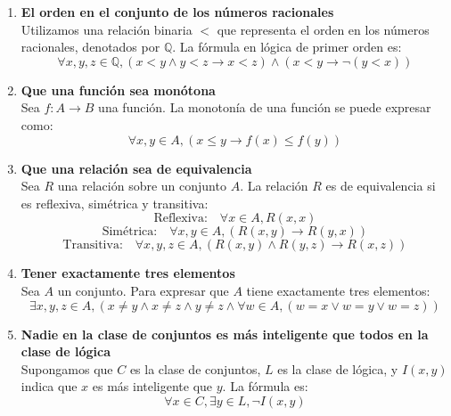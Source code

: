 \begin{solution}
    \begin{enumerate}
    \item \textbf{El orden en el conjunto de los números racionales} \\
    Utilizamos una relación binaria \( < \) que representa el orden en los números racionales, denotados por \( \mathbb{Q} \). La fórmula en lógica de primer orden es:
    \[
    \forall x, y, z \in \mathbb{Q}, (x < y \land y < z \rightarrow x < z) \land (x < y \rightarrow \neg(y < x))
    \]

    \item \textbf{Que una función sea monótona} \\
    Sea \( f: A \rightarrow B \) una función. La monotonía de una función se puede expresar como:
    \[
    \forall x, y \in A, (x \leq y \rightarrow f(x) \leq f(y))
    \]

    \item \textbf{Que una relación sea de equivalencia} \\
    Sea \( R \) una relación sobre un conjunto \( A \). La relación \( R \) es de equivalencia si es reflexiva, simétrica y transitiva:
    \[
    \text{Reflexiva:} \quad \forall x \in A, R(x, x)
    \]
    \[
    \text{Simétrica:} \quad \forall x, y \in A, (R(x, y) \rightarrow R(y, x))
    \]
    \[
    \text{Transitiva:} \quad \forall x, y, z \in A, (R(x, y) \land R(y, z) \rightarrow R(x, z))
    \]

    \item \textbf{Tener exactamente tres elementos} \\
    Sea \( A \) un conjunto. Para expresar que \( A \) tiene exactamente tres elementos:
    \[
    \exists x, y, z \in A, (x \neq y \land x \neq z \land y \neq z \land \forall w \in A, (w = x \lor w = y \lor w = z))
    \]

    \item \textbf{Nadie en la clase de conjuntos es más inteligente que todos en la clase de lógica} \\
    Supongamos que \( C \) es la clase de conjuntos, \( L \) es la clase de lógica, y \( I(x, y) \) indica que \( x \) es más inteligente que \( y \). La fórmula es:
    \[
    \forall x \in C, \exists y \in L, \neg I(x, y)
    \]
\end{enumerate}
\end{solution}